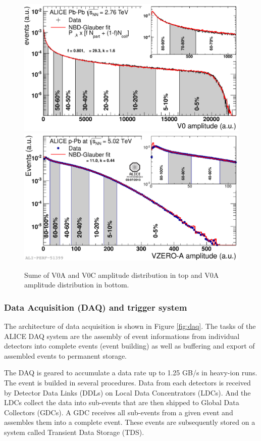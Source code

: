 \begin{figure}[htbp]
\begin{center}
\includegraphics[width=12.cm]{./Version1/FigChapter4/CentralityPbPb}
\hspace{1.0cm}
\includegraphics[width=12.cm]{./Version1/FigChapter4/CentralitypPb}
\caption{ Sume of V0A and V0C amplitude distribution in top and V0A amplitude distribution in bottom.}
\label{fig:centralityestimate}
\end{center}
\end{figure}

\newpage
\subsubsection{Data Acquisition (DAQ) and trigger system}\label{label:aliceDAQ}
The architecture of data acquisition is shown in Figure \ref{fig:daq}. The tasks of the ALICE DAQ system are the assembly of event informations from individual detectors into complete events (event building) as well as buffering and export of assembled events to permanent storage. 

The DAQ is geared to accumulate a data rate up to 1.25 GB/s in heavy-ion runs. The event is builded in several procedures. Data from each detectors is received by Detector Data Links (DDLs) on Local Data Concentrators (LDCs). And the LDCs collect the data into sub-events that are then shipped to Global Data Collectors (GDCs). A GDC receives all sub-events from a given event and assembles them into a complete event. These events are subsequently stored on a system called Transient Data Storage (TDS).


